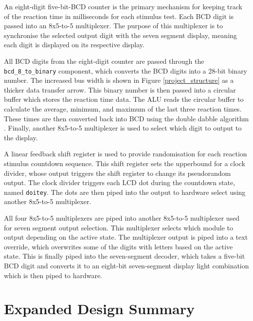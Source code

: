 \documentclass[11pt]{article}
\begin{document}
An eight-digit five-bit-BCD counter is the primary mechanism for keeping track of the reaction time in milliseconds for each stimulus test. Each BCD digit is passed into an 8x5-to-5 multiplexer. The purpose of this multiplexer is to synchronise the selected output digit with the seven segment display, meaning each digit is displayed on its respective display.

All BCD digits from the eight-digit counter are passed through the \texttt{bcd\_8\_to\_binary} component, which converts the BCD digits into a 28-bit binary number. The increased bus width is shown in Figure \ref{project_structure} as a thicker data transfer arrow. This binary number is then passed into a circular buffer which stores the reaction time data. The ALU reads the circular buffer to calculate the average, minimum, and maximum of the last three reaction times. These times are then converted back into BCD using the double dabble algorithm \cite{double_dabble}. Finally, another 8x5-to-5 multiplexer is used to select which digit to output to the display.

A linear feedback shift register is used to provide randomisation for each reaction stimulus countdown sequence. This shift register sets the upperbound for a clock divider, whose output triggers the shift register to change its pseudorandom output. The clock divider triggers each LCD dot during the countdown state, named \texttt{doitey}. The dots are then piped into the output to hardware select using another 8x5-to-5 multiplexer.

All four 8x5-to-5 multiplexers are piped into another 8x5-to-5 multiplexer used for seven segment output selection. This multiplexer selects which module to output depending on the active state. The multiplexer output is piped into a text override, which overwrites some of the digits with letters based on the active state. This is finally piped into the seven-segment decoder, which takes a five-bit BCD digit and converts it to an eight-bit seven-segment display light combination which is then piped to hardware.


\section{Expanded Design Summary}
\end{document}

